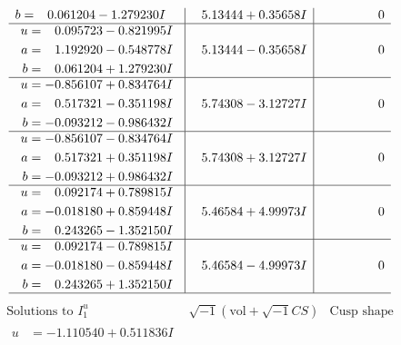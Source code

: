\documentclass[1p]{elsarticle_modified}
\theoremstyle{definition}
\newcommand{\I}{\sqrt{-1}}
\begin{document}
$$\begin{array}{c|c|c}
\begin{aligned}
b &= \phantom{-}0.061204 - 1.279230 I\end{aligned}
 & \phantom{-}5.13444 + 0.35658 I & \phantom{-0.000000 } 0 \\ \hline\begin{aligned}
u &= \phantom{-}0.095723 - 0.821995 I \\
a &= \phantom{-}1.192920 - 0.548778 I \\
b &= \phantom{-}0.061204 + 1.279230 I\end{aligned}
 & \phantom{-}5.13444 - 0.35658 I & \phantom{-0.000000 } 0 \\ \hline\begin{aligned}
u &= -0.856107 + 0.834764 I \\
a &= \phantom{-}0.517321 - 0.351198 I \\
b &= -0.093212 - 0.986432 I\end{aligned}
 & \phantom{-}5.74308 - 3.12727 I & \phantom{-0.000000 } 0 \\ \hline\begin{aligned}
u &= -0.856107 - 0.834764 I \\
a &= \phantom{-}0.517321 + 0.351198 I \\
b &= -0.093212 + 0.986432 I\end{aligned}
 & \phantom{-}5.74308 + 3.12727 I & \phantom{-0.000000 } 0 \\ \hline\begin{aligned}
u &= \phantom{-}0.092174 + 0.789815 I \\
a &= -0.018180 + 0.859448 I \\
b &= \phantom{-}0.243265 - 1.352150 I\end{aligned}
 & \phantom{-}5.46584 + 4.99973 I & \phantom{-0.000000 } 0 \\ \hline\begin{aligned}
u &= \phantom{-}0.092174 - 0.789815 I \\
a &= -0.018180 - 0.859448 I \\
b &= \phantom{-}0.243265 + 1.352150 I\end{aligned}
 & \phantom{-}5.46584 - 4.99973 I & \phantom{-0.000000 } 0\\
 \hline 
 \end{array}$$\newpage$$\begin{array}{c|c|c}  
\text{Solutions to }I^u_{1}& \I (\text{vol} + \sqrt{-1}CS) & \text{Cusp shape}\\
 \hline 
\begin{aligned}
u &= -1.110540 + 0.511836 I \\

\end{aligned}
\end{array}$$
\end{document}
